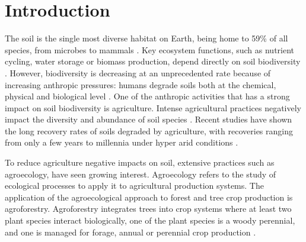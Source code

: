 \documentclass[fleqn,10pt]{ArtEcoFoG} %
\affiliation{
\textsuperscript{1}Tropical Forest Ecology Master, AgroParistech.\\ \hspace{1em} Campus Agronomique, 97310 Kourou, France.
}
\affiliation{*\textbf{Contact}: , } %
\begin{document}

\flushbottom %

\maketitle %

\tableofcontents %

\thispagestyle{empty} %



\scriptsize

\normalsize

\section{Introduction}\label{introduction}

The soil is the single most diverse habitat on Earth, being home to 59\% of all species, from microbes to mammals \citep{anthony_enumerating_2023}. Key ecosystem functions, such as nutrient cycling, water storage or biomass production, depend directly on soil biodiversity \citep{brussaard_soil_2012, safaei_assessing_2019}. However, biodiversity is decreasing at an unprecedented rate because of increasing anthropic pressures: humans degrade soils both at the chemical, physical and biological level \citep{jose_agroforestry_2012, ferreira_soil_2022}. One of the anthropic activities that has a strong impact on soil biodiversity is agriculture. Intense agricultural practices negatively impact the diversity and abundance of soil species \citep{bedolla-rivera_analyzing_2023}. Recent studies have shown the long recovery rates of soils degraded by agriculture, with recoveries ranging from only a few years \citep{DOJANI2011263} to millennia under hyper arid conditions \citep{Weber2016}.

To reduce agriculture negative impacts on soil, extensive practices such as agroecology, have seen growing interest. Agroecology refers to the study of ecological processes to apply it to agricultural production systems. The application of the agroecological approach to forest and tree crop production is agroforestry. Agroforestry integrates trees into crop systems where at least two plant species interact biologically, one of the plant species is a woody perennial, and one is managed for forage, annual or perennial crop production \citep{somarriba_revisiting_1992}.
\end{document}
